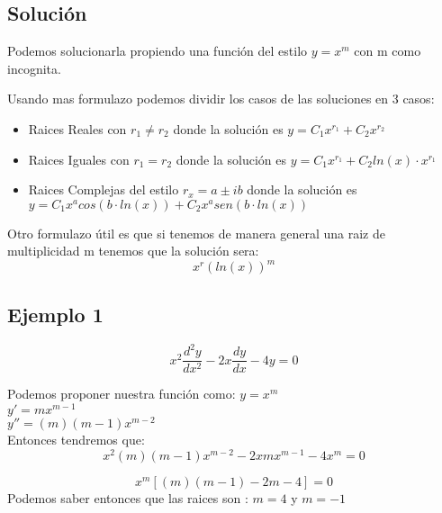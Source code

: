 \documentclass[12pt]{article}							    %
\begin{document}
		\subsection{Solución}
		Podemos solucionarla propiendo una función del estilo $y = x^m$ con m como incognita.

		Usando mas formulazo podemos dividir los casos de las soluciones en 3 casos:

		\begin{itemize}
			\item Raices Reales con $r_1 \neq r_2$ donde la solución es $ y = C_1 x ^{r_1} + C_2 x^{r_2}$ 
			\item Raices Iguales con $r_1 = r_2$ donde la solución es $ y = C_1 x ^{r_1} + C_2 ln(x) \cdot x^{r_1}$ 
			\item Raices Complejas del estilo $r_x  = a \pm ib$ donde la solución es \\
			$ y = C_1 x^a cos(b \cdot ln(x)) + C_2 x^a sen(b \cdot ln(x))$ 
		\end{itemize}


		Otro formulazo útil es que si tenemos de manera general una raiz de multiplicidad m tenemos que la solución sera:
		\begin{equation}
			x^r (ln(x))^m
		\end{equation}


		\subsection{Ejemplo 1}
		\begin{equation*}
			x^2 \frac{d^2 y}{dx^2} - 2x \frac{dy}{dx} - 4y = 0
		\end{equation*}

		Podemos proponer nuestra función como:
		$y = x^m$\\
		$y' = mx^{m-1}$\\
		$y'' = (m)(m-1)x^{m-2}$\\

		Entonces tendremos que:
		\begin{equation*}
			x^2 (m)(m-1)x^{m-2} - 2x mx^{m-1} - 4x^m = 0
		\end{equation*}

		\begin{equation*}
			x^m [(m)(m-1)-  2m -4] = 0
		\end{equation*}
		Podemos saber entonces que las raices son : $ m = 4$ y $m = -1$
\end{document}
